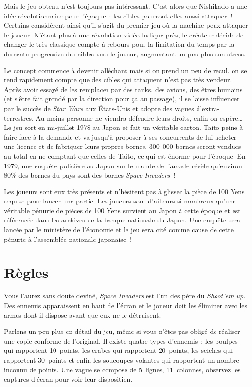 Mais le jeu obtenu n'est toujours pas intéressant. C'est alors que Nishikado a
une idée révolutionnaire pour l'époque~: les cibles pourront elles aussi
attaquer~! Certains considèrent ainsi qu'il s'agit du premier jeu où la machine
peux attaquer le joueur. N'étant plus à une révolution vidéo-ludique près, le
créateur décide de changer le très classique compte à rebours pour la
limitation du temps par la descente progressive des cibles vers le joueur,
augmentant un peu plus son stress.

Le concept commence à devenir alléchant mais si on prend un peu de recul, on
se rend rapidement compte que des cibles qui attaquent n'est pas très vendeur.
Après avoir essayé de les remplacer par des tanks, des avions, des êtres
humains (et s'être fait grondé par la direction pour ça au passage), il se laisse
influencer par le succès de \emph{Star Wars} aux États-Unis et adopte des
vagues d'extra-terrestres. Au moins personne ne viendra défendre leurs droits,
enfin on espère\dots
\\

Le jeu sort en mi-juillet 1978 au Japon et fait un véritable carton. Taito
peine à faire face à la demande et va jusqu'à proposer à ses concurrents de lui
acheter une licence et de fabriquer leurs propres bornes. 300~000 bornes seront
vendues au total en ne comptant que celles de Taito, ce qui est énorme pour
l'époque. En 1979, une enquête policière au Japon sur le monde de l'arcade
révèle qu'environ 80\% des bornes du pays sont des bornes \emph{Space Invaders}~!

Les joueurs sont eux très présents et n'hésitent pas à glisser la pièce de 100
Yens requise pour lancer une partie. Les joueurs sont d'ailleurs si nombreux qu'une
véritable pénurie de pièces de 100 Yens survient au Japon à cette époque et est
référencée dans les archives de la banque nationale du Japon. Une enquête sera
lancée par le ministère de l'économie et le jeu sera cité comme cause de cette
pénurie à l'assemblée nationale japonaise~!

\section{Règles}

Vous l'aurez sans doute deviné, \emph{Space Invaders} est l'un des père du
\emph{Shoot'em up}. Des ennemis apparaissent en haut de l'écran et le
joueur doit les éliminer avec les armes dont il dispose avant que eux ne le
détruisent.

Parlons un peu plus en détail du jeu, même si vous n'êtes pas obligé de
réaliser une copie conforme de l'original. Il existe quatre types
d'ennemis~: les poulpes qui rapportent 10~points, les crabes qui rapportent
20~points, les seiches qui rapportent 30~points et enfin les soucoupes volantes
qui rapportent un nombre inconnu de points. Une vague se compose de 5~lignes,
11~colonnes, observez les captures d'écran pour voir leur disposition.

